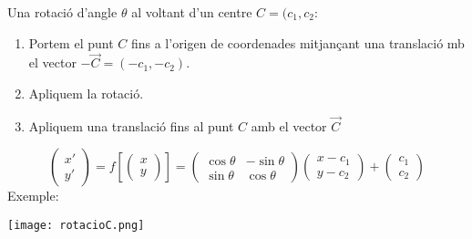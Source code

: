 \documentclass{beamer}
\begin{document}
\begin{frame}
  Una rotació d'angle $\theta$ al voltant d'un centre $C=(c_1,c_2$:
  \begin{enumerate}
    \item Portem el punt $C$ fins a l'origen de coordenades mitjançant una translació mb el vector $-\overrightarrow{C}=(-c_1,-c_2)$.
    \item Apliquem la rotació.
    \item Apliquem una translació fins al punt $C$ amb el vector $\overrightarrow{C}$
  \end{enumerate}

  \[
    \begin{pmatrix} x'\\y' \end{pmatrix}=
      f \left[ \begin{pmatrix} x\\y \end{pmatrix} \right]=
      \begin{pmatrix}\cos{\theta}&-\sin{\theta}\\\sin{\theta}&\cos{\theta}\end{pmatrix}
      \begin{pmatrix}x-c_1\\y-c_2\end{pmatrix} +
      \begin{pmatrix}c_1\\c_2\end{pmatrix}
  \]
  Exemple:
  \begin{center}
    \texttt{[image: rotacioC.png]}
  \end{center}
\end{frame}
\end{document}
